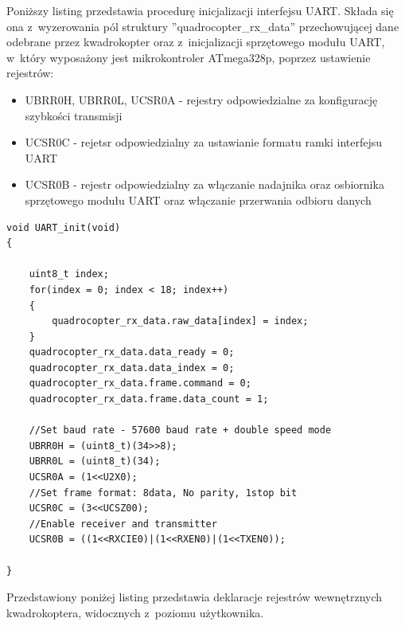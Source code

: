 \documentclass[11pt, twoside]{Thesis} %
\begin{document}
Poniższy listing przedstawia procedurę inicjalizacji interfejsu UART. Składa się ona z~wyzerowania pól struktury ''quadrocopter\_rx\_data'' przechowującej dane odebrane przez kwadrokopter oraz z~inicjalizacji sprzętowego modułu UART, w~który wyposażony jest mikrokontroler ATmega328p, poprzez ustawienie rejestrów:
\begin{itemize}
	\item UBRR0H, UBRR0L, UCSR0A - rejestry odpowiedzialne za konfigurację szybkości transmisji
	\item UCSR0C - rejetsr odpowiedzialny za ustawianie formatu ramki interfejsu UART
	\item UCSR0B - rejestr odpowiedzialny za włączanie nadajnika oraz osbiornika sprzętowego modułu UART oraz włączanie przerwania odbioru danych
\end{itemize}

\begin{lstlisting}
void UART_init(void)
{

    uint8_t index;
    for(index = 0; index < 18; index++)
    {
        quadrocopter_rx_data.raw_data[index] = index;
    }
    quadrocopter_rx_data.data_ready = 0;
    quadrocopter_rx_data.data_index = 0;
    quadrocopter_rx_data.frame.command = 0;
    quadrocopter_rx_data.frame.data_count = 1;

	//Set baud rate - 57600 baud rate + double speed mode
	UBRR0H = (uint8_t)(34>>8);
	UBRR0L = (uint8_t)(34);
	UCSR0A = (1<<U2X0);
	//Set frame format: 8data, No parity, 1stop bit
	UCSR0C = (3<<UCSZ00);
	//Enable receiver and transmitter
	UCSR0B = ((1<<RXCIE0)|(1<<RXEN0)|(1<<TXEN0));

}
\end{lstlisting}

Przedstawiony poniżej listing przedstawia deklaracje rejestrów wewnętrznych kwadrokoptera, widocznych z~poziomu użytkownika. 
\end{document}
